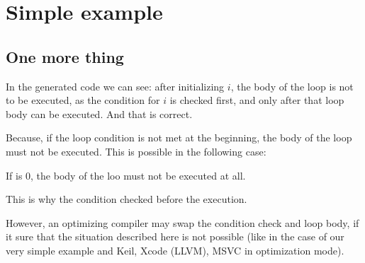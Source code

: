 \section{Simple example}


\ifdefined\IncludeARM

\fi
\ifdefined\IncludeMIPS

\fi

\subsection{One more thing}

In the generated code we can see: 
after initializing $i$, the body of the loop is not to be executed,
as the condition for $i$ is checked first, and only after that loop body can be executed.
And that is correct. 

Because, if the loop condition is
not met at the beginning, the body of the loop must not be executed.
This is possible in the following case:



If  is 0, the body of the loo must not be executed at all.

This is why the condition checked before the execution.

However, an optimizing compiler may swap the condition check and loop body,
if it sure that the situation described here is
not possible (like in the case of our very simple example and Keil, Xcode (LLVM), MSVC in optimization mode).
